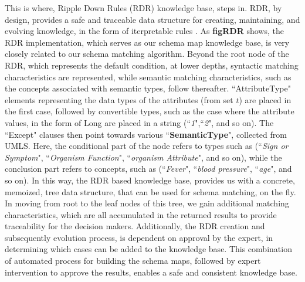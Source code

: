 This is where, Ripple Down Rules (RDR) knowledge base, steps in. RDR, by design, provides a safe and traceable data structure for creating, maintaining, and evolving knowledge, in the form of iterpretable rules \cite{compton1992ripple, richards2009two, kim2018rdr}. As \textbf{figRDR} shows, the RDR implementation, which serves as our schema map knowledge base, is very closely related to our schema matching algorithm. Beyond the root node of the RDR, which represents the default condition, at lower depths, syntactic matching characteristics are represented, while semantic matching characteristics, such as the concepts associated with semantic types, follow thereafter. ``AttributeType" elements representing the data types of the attributes (from set $t$) are placed in the first case, followed by convertible types, such as the case where the attribute values, in the form of Long are placed in a string (``\textit{1}",``\textit{2}", and so on). The ``Except" clauses then point towards various ``\textbf{SemanticType}", collected from UMLS. Here, the conditional part of the node refers to types such as (``\textit{Sign or Symptom}", ``\textit{Organism Function}", ``\textit{organism Attribute}", and so on), while the conclusion part refers to concepts, such as (``\textit{Fever}", ``\textit{blood pressure}", ``\textit{age}", and so on). In this way, the RDR based knowledge base, provides us with a concrete, memoized, tree data structure, that can be used for schema matching, on the fly. In moving from root to the leaf nodes of this tree, we gain additional matching characteristics, which are all accumulated in the returned results to provide traceability for the decision makers. Additionally, the RDR creation and subsequently evolution process, is dependent on approval by the expert, in determining which cases can be added to the knowledge base. This combination of automated process for building the schema maps, followed by expert intervention to approve the results, enables a safe and consistent knowledge base. 
